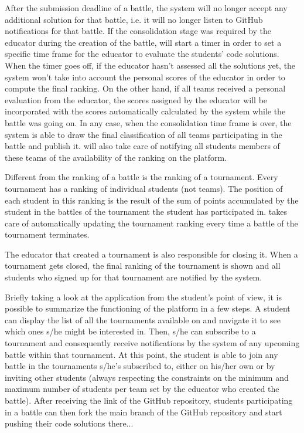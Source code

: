 	After the submission deadline of a battle, the system will no longer accept any additional solution for that battle, i.e. it will no longer listen to GitHub notifications for that battle. If the consolidation stage was required by the educator during the creation of the battle, \app will start a timer in order to set a specific time frame for the educator to evaluate the students' code solutions. When the timer goes off, if the educator hasn't assessed all the solutions yet, the system won't take into account the personal scores of the educator in order to compute the final ranking. On the other hand, if all teams received a personal evaluation from the educator, the scores assigned by the educator will be incorporated with the scores automatically calculated by the system while the battle was going on. In any case, when the consolidation time frame is over, the system is able to draw the final classification of all teams participating in the battle and publish it. \app will also take care of notifying all students members of these teams of the availability of the ranking on the platform.
	
	Different from the ranking of a battle is the ranking of a tournament. Every tournament has a ranking of individual students (not teams). The position of each student in this ranking is the result of the sum of points accumulated by the student in the battles of the tournament the student has participated in.
	\app takes care of automatically updating the tournament ranking every time a battle of the tournament terminates.
	
	The educator that created a tournament is also responsible for closing it. When a tournament gets closed, the final ranking of the tournament is shown and all students who signed up for that tournament are notified by the system.
	
	Briefly taking a look at the application from the student's point of view, it is possible to summarize the functioning of the platform in a  few steps. A student can display the list of all the tournaments available on \app and navigate it to see which ones s/he might be interested in. Then, s/he can subscribe to a tournament and consequently receive notifications by the system of any upcoming battle within that tournament. 
	At this point, the student is able to join any battle in the tournaments s/he's subscribed to, either on his/her own or by inviting other students (always respecting the constraints on the minimum and maximum number of students per team set by the educator who created the battle). After receiving the link of the GitHub repository, students participating in a battle can then fork the main branch of the GitHub repository and start pushing their code solutions there...
	

